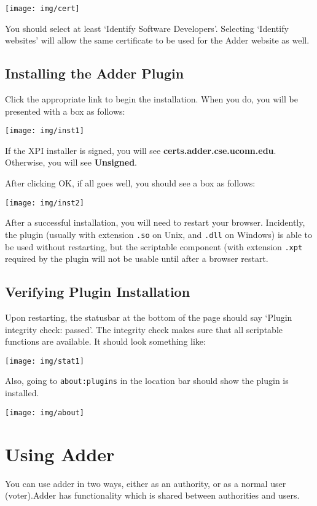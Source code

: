 \documentclass[letterpaper,10pt]{article}
\begin{document}
\texttt{[image: img/cert]}

You should select at least `Identify Software Developers'.
Selecting `Identify websites' will allow the same certificate to be
used for the Adder website as well.

\subsection{Installing the Adder Plugin}

Click the appropriate link to begin the installation. When you do,
you will be presented with a box as follows:

\texttt{[image: img/inst1]}

If the XPI installer is signed, you will see
\textbf{certs.adder.cse.uconn.edu}. Otherwise, you will see
\textbf{Unsigned}.

After clicking OK, if all goes well, you should see a box as
follows:

\texttt{[image: img/inst2]}

After a successful installation, you will need to restart your
browser. Incidently, the plugin (usually with extension \texttt{.so}
on Unix, and \texttt{.dll} on Windows) is able to be used without
restarting, but the scriptable component (with extension
\texttt{.xpt} required by the plugin will not be usable until after
a browser restart.

\subsection{Verifying Plugin Installation}

Upon restarting, the statusbar at the bottom of the page should say
`Plugin integrity check: passed'. The integrity check makes sure
that all scriptable functions are available. It should look
something like:

\texttt{[image: img/stat1]}

Also, going to \texttt{about:plugins} in the location bar should
show the plugin is installed.

\texttt{[image: img/about]}

\section{Using Adder}

You can use adder in two ways, either as an authority, or as a
normal user (voter).Adder has functionality which is shared between
authorities and users.
\end{document}
